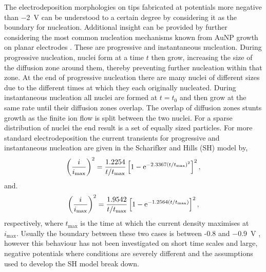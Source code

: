 \documentclass{article}
\begin{document}
The electrodeposition morphologies on tips fabricated at potentials more negative than \SI{-2}{V} can be understood to a certain degree by considering it as the boundary for nucleation. Additional insight can be provided by further considering the most common nucleation mechanisms known from AuNP growth on planar electrodes \cite{scharifker1983}. These are progressive and instantaneous nucleation. During progressive nucleation, nuclei form at a time $t$ then grow, increasing the size of the diffusion zone around them, thereby preventing further nucleation within that zone. At the end of progressive nucleation there are many nuclei of different sizes due to the different times at which they each originally nucleated. During instantaneous nucleation all nuclei are formed at $t=t_0$ and then grow at the same rate until their diffusion zones overlap. The overlap of diffusion zones stunts growth as the finite ion flow is split between the two nuclei. For a sparse distribution of nuclei the end result is a set of equally sized particles. For more standard electrodeposition the current transients for progressive and instantaneous nucleation are given in the Scharifker and Hills (SH) model by,
\begin{equation}
\left(\frac{i}{i_{\mathrm{max}}}\right)^2 = \frac{1.2254}{t/t_{\mathrm{max}}} \left[ 1 - \mathrm{e}^{-2.3367(t/t_{\mathrm{max}})^2} \right]^2,
\label{eq:prog_nucleation}
\end{equation}
and.
\begin{equation}
\left(\frac{i}{i_{\mathrm{max}}}\right)^2 = \frac{1.9542}{t/t_{\mathrm{max}}} \left[ 1 - \mathrm{e}^{-1.2564(t/t_{\mathrm{max}})} \right]^2,
\label{eq:inst_nucleation}
\end{equation}
respectively, where $t_{\mathrm{max}}$ is the time at which the current density maximises at $i_{\mathrm{max}}$. {\color{red}Usually the boundary between these two cases is between -0.8 and \SI{-0.9}{V} \cite{}, however this behaviour has not been investigated on short time scales and large, negative potentials where conditions are severely different and the assumptions used to develop the SH model break down.}
\end{document}
